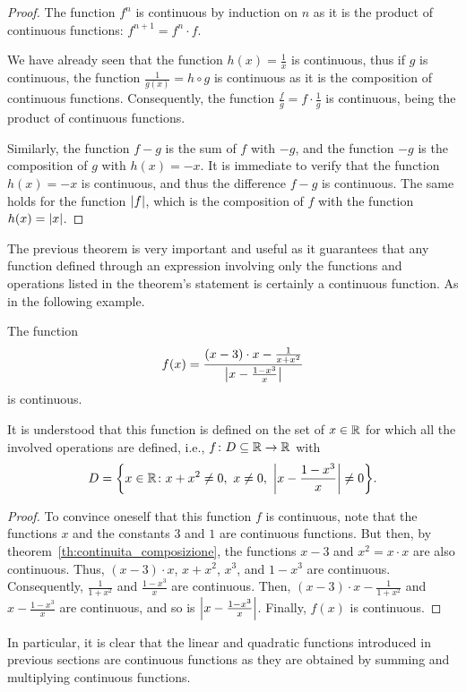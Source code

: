 \begin{proof}
  The function $f^n$ is continuous by induction on $n$
  as it is the product of continuous functions: $f^{n+1} = f^{n} \cdot f$.
  
  We have already seen that the function $h(x) = \frac{1}{x}$ is continuous,
  thus if $g$ is continuous, the function $\frac{1}{g(x)} = h\circ g$
  is continuous as it is the composition of continuous functions. 
  Consequently, the function $\frac{f}{g} = f \cdot \frac{1}{g}$
  is continuous, being the product of continuous functions.
  
  Similarly, the function $f-g$ is the sum of $f$ with $-g$, and
  the function $-g$ is the composition of $g$ with $h(x)=-x$.
  It is immediate to verify that the function $h(x)=-x$ is continuous,
  and thus the difference $f-g$ is continuous.
  The same holds for the function ${\left|f\right|}$, which is the composition
  of $f$ with the function $h(x) = {\left|x\right|}$.
  \end{proof}
  
  The previous theorem is very important and useful as
  it guarantees that any function defined through an expression
  involving only the functions and operations
  listed in the theorem's statement is certainly
  a continuous function. As in the following example.
  
  \begin{example}
  The function
  \[
  f(x) = \frac{(x-3)\cdot x -\frac{1}{x+x^2}}{{\left|x-\frac{1-x^3}{x}\right|}}
  \]
  is continuous.
  
  It is understood that this function is defined on the set of $x\in {\mathbb R}$
  for which all the involved operations are defined, i.e.,
  $f\colon D \subseteq {\mathbb R} \to {\mathbb R}$
  with
  \[
        D = {\left\{ x\in {\mathbb R} \colon x+x^2 \neq 0,\ x\neq 0,\
    {\left|x-\frac{1-x^3}{x}\right|}\neq 0 \right\}}.
  \]
  \end{example}
  \begin{proof}
  To convince oneself that this function $f$ is continuous,
  note that the functions $x$ and the constants $3$ and $1$ are
  continuous functions.
  But then, by theorem~\ref{th:continuita_composizione},
  the functions $x-3$ and $x^2=x\cdot x$ are also continuous.
  Thus, $(x-3)\cdot x$, $x+x^2$, $x^3$, and $1-x^3$ are continuous.
  Consequently, $\frac 1{1+x^2}$ and $\frac{1-x^3}{x}$ are continuous.
  Then, $(x-3)\cdot x - \frac 1{1+x^2}$ and $x-\frac{1-x^3}{x}$
  are continuous, and so is ${\left|x-\frac{1-x^3}{x}\right|}$. Finally,
  $f(x)$ is continuous.
  \end{proof}
  
  In particular, it is clear that the linear and quadratic functions 
  introduced in previous sections are continuous functions
  as they are obtained by summing and multiplying continuous functions.
  
